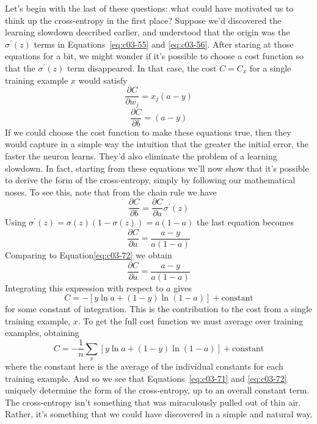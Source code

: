 Let's begin with the last of these questions: what could have motivated us to think up the cross-entropy in the first place? Suppose we'd discovered the learning slowdown described earlier, and understood that the origin was the $\sigma^{\prime}(z)$ terms in Equations~\ref{eq:c03-55} and \ref{eq:c03-56}. After staring at those equations for a bit, we might wonder if it's possible to choose a cost function so that the $\sigma^{\prime}(z)$  term disappeared. In that case, the cost $C=C_{x}$ for a single training example $x$ would satisfy 
\begin{equation}
\frac{\partial C}{\partial w_{j}}=x_{j}(a-y)
\label{eq:c03-71} 
\end{equation}
\begin{equation}
\frac{\partial C}{\partial b}=(a-y)
\label{eq:c03-72} 
\end{equation}
If we could choose the cost function to make these equations true, then they would capture in a simple way the intuition that the greater the initial error, the faster the neuron learns. They'd also eliminate the problem of a learning slowdown. In fact, starting from these equations we'll now show that it's possible to derive the form of the cross-entropy, simply by following our mathematical noses. To see this, note that from the chain rule we have 
\begin{equation}
\frac{\partial C}{\partial b}=\frac{\partial C}{\partial a} \sigma^{\prime}(z)
\label{eq:c03-73} 
\end{equation}
Using $\sigma^{\prime}(z)=\sigma(z)(1-\sigma(z))=a(1-a)$ the last equation becomes 
\begin{equation}
\frac{\partial C}{\partial a}=\frac{a-y}{a(1-a)}
\label{eq:c03-74} 
\end{equation}
Comparing to Equation\ref{eq:c03-72}  we obtain 
\begin{equation}
\frac{\partial C}{\partial a}=\frac{a-y}{a(1-a)}
\label{eq:c03-75} 
\end{equation}
Integrating this expression with respect to $a$ gives 
\begin{equation}
C=-[y \ln a+(1-y) \ln (1-a)]+\textrm{constant}
\label{eq:c03-76} 
\end{equation}
for some constant of integration. This is the contribution to the cost from a single training example, $x$. To get the full cost function we must average over training examples, obtaining 
\begin{equation}
C=-\frac{1}{n} \sum_{x}[y \ln a+(1-y) \ln (1-a)]+\textrm{constant}
\label{eq:c03-77} 
\end{equation}
where the constant here is the average of the individual constants for each training example. And so we see that Equations~\ref{eq:c03-71}  and \ref{eq:c03-72}  uniquely determine the form of the cross-entropy, up to an overall constant term. The cross-entropy isn't something that was miraculously pulled out of thin air. Rather, it's something that we could have discovered in a simple and natural way.

